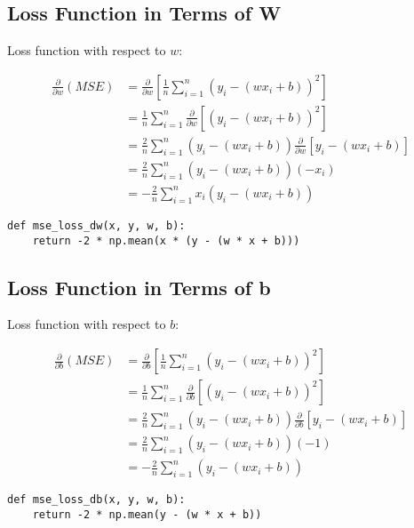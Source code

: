 \documentclass[openany]{book}
\begin{document}
    \subsection{Loss Function in Terms of
W}\label{loss-function-in-terms-of-w}

    Loss function with respect to \(w\):

\begin{align*}
\frac{\partial }{\partial w} \left( MSE \right) &= \frac{\partial }{\partial w}[\frac{1}{n} \sum_{i=1}^{n}(y_{i}-(w x_{i} + b))^2] \\
&= \frac{1}{n} \sum_{i=1}^{n} \frac{\partial }{\partial w}[(y_{i}-(w x_{i} + b))^2] \\
&= \frac{2}{n} \sum_{i=1}^{n} (y_{i}-(w x_{i} + b))\frac{\partial }{\partial w}[y_{i}-(w x_{i} + b)] \\
&= \frac{2}{n} \sum_{i=1}^{n} (y_{i}-(w x_{i} + b))(-x_{i}) \\ 
&= -\frac{2}{n} \sum_{i=1}^{n}x_{i}(y_{i}-(w x_{i} + b))
\end{align*}

\begin{tcolorbox}
\tiny
\begin{verbatim}
def mse_loss_dw(x, y, w, b):
    return -2 * np.mean(x * (y - (w * x + b)))
\end{verbatim}
\end{tcolorbox}

    \subsection{Loss Function in Terms of
b}\label{loss-function-in-terms-of-b}

    Loss function with respect to \(b\):

\begin{align*}
\frac{\partial}{\partial b} \left( MSE \right) &=  \frac{\partial }{\partial b}[\frac{1}{n} \sum_{i=1}^{n}(y_{i}-(w x_{i} + b))^2] \\
&= \frac{1}{n} \sum_{i=1}^{n} \frac{\partial }{\partial b}[(y_{i}-(w x_{i} + b))^2] \\
&= \frac{2}{n} \sum_{i=1}^{n} (y_{i}-(w x_{i} + b))\frac{\partial }{\partial b}[y_{i}-(w x_{i} + b)] \\
&= \frac{2}{n} \sum_{i=1}^{n} (y_{i}-(w x_{i} + b))(-1) \\ 
&= -\frac{2}{n} \sum_{i=1}^{n} (y_{i}-(w x_{i} + b))
\end{align*}

\begin{tcolorbox}
\tiny
\begin{verbatim}
def mse_loss_db(x, y, w, b):
    return -2 * np.mean(y - (w * x + b))
\end{verbatim}
\end{tcolorbox}
\end{document}
